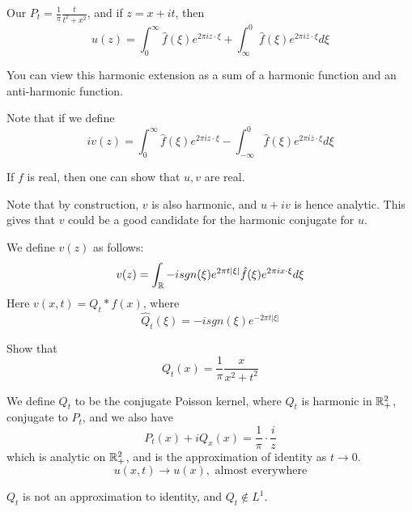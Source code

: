 Our $P_t=\frac{1}{\pi}\frac{t}{t^2+x^2}$, and if $z=x+it$, then
\begin{equation}
    u(z)=\int_0^\infty\hat{f}(\xi)e^{2\pi iz\cdot\xi}+\int_{\infty}^0\hat{f}(\xi)e^{2\pi i\overline{z}\cdot\xi}d\xi
\end{equation}
\begin{note}
    You can view this harmonic extension as a sum of a harmonic function and an anti-harmonic function.
\end{note}
Note that if we define
\begin{equation*}
    iv(z)=\int_0^\infty \hat{f}(\xi)e^{2\pi iz\cdot\xi}-\int_{-\infty}^0\hat{f}(\xi)e^{2\pi i\overline{z}\cdot\xi}d\xi
\end{equation*}
\begin{exercise}
    If $f$ is real, then one can show that $u,v$ are real.
\end{exercise}
Note that by construction, $v$ is also harmonic, and $u+iv$ is hence analytic. This gives that $v$ could be a good candidate for the harmonic conjugate for $u$.

\begin{definition}
    We define $v(z)$ as follows:
    \begin{equation*}
        v(z)=\int_{\mathbb{R}}-isgn(\xi)e^{2\pi t|\xi|}\hat{f}(\xi)e^{2\pi i x\cdot\xi}d\xi
    \end{equation*}
    Here $v(x,t)=Q_t\ast f(x)$, where
    \begin{equation*}
        \hat{Q}_t(\xi)=-isgn(\xi)e^{-2\pi t|\xi|}
    \end{equation*}
\end{definition}
\begin{exercise}
    Show that
    \begin{equation*}
        Q_t(x)=\frac{1}{\pi}\frac{x}{x^2+t^2}
    \end{equation*}
\end{exercise}
We define $Q_t$ to be the conjugate Poisson kernel, where $Q_t$ is harmonic in $\mathbb{R}_+^2$, conjugate to $P_t$, and we also have
\begin{equation*}
    P_t(x)+iQ_x(x)=\frac{1}{\pi}\cdot\frac{i}{z}
\end{equation*}
which is analytic on $\mathbb{R}_+^2$, and is the approximation of identity as $t\to 0$.
\begin{equation*}
    u(x,t)\to u(x), \text{ almost everywhere}
\end{equation*}
\begin{note}
    $Q_t$ is not an approximation to identity, and $Q_t\not\in L^1$.
\end{note}

